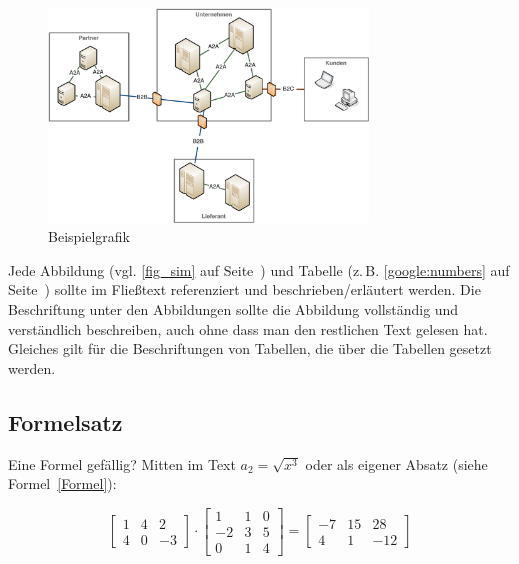 \documentclass[conference,compsoc,final,a4paper]{IEEEtran}
\begin{document}
    \begin{figure}[!ht]
        \centering
        \includegraphics[width=8.5cm]{bsp1.pdf}
        \caption{Beispielgrafik~\cite{Dean2012}}
        \label{fig_sim}
    \end{figure}

    Jede Abbildung (vgl. \autoref{fig_sim} auf Seite~\pageref{fig_sim}) und Tabelle (z.\,B. \autoref{google:numbers} auf Seite~\pageref{google:numbers}) sollte im Fließtext referenziert und beschrieben/erläutert werden. Die Beschriftung unter den Abbildungen sollte die Abbildung vollständig und verständlich beschreiben, auch ohne dass man den restlichen Text gelesen hat. Gleiches gilt für die Beschriftungen von Tabellen, die über die Tabellen gesetzt werden.

    \subsection{Formelsatz}
    Eine Formel gefällig? Mitten im Text $a_2 = \sqrt{x^3}$ oder als eigener Absatz (siehe Formel~\ref{Formel}):

    \begin{equation}
        \begin{bmatrix}
            1 & 4 & 2  \\
            4 & 0 & -3
        \end{bmatrix}
        \cdot
        \begin{bmatrix}
            1  & 1 & 0 \\
            -2 & 3 & 5 \\
            0  & 1 & 4
        \end{bmatrix}
        {=}
        \begin{bmatrix}
            -7 & 15 & 28  \\
            4  & 1  & -12
        \end{bmatrix}
        \label{Formel}
    \end{equation}
\end{document}
